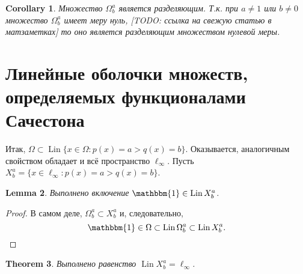 \documentclass[a4paper,14pt]{article} %
\theoremstyle{plain}
\newtheorem{theorem}{Theorem}[section]
\newtheorem{lemma}[theorem]{Lemma}
\newtheorem{corollary}[theorem]{Corollary}
\theoremstyle{definition}
\begin{document}
\begin{corollary}
	Множество $\Omega^a_b$ является разделяющим.
	Т.к. при $a\neq 1$ или $b\neq 0$ множество $\Omega^a_b$ имеет меру нуль,
	[TODO: ссылка на свежую статью в матзаметках]
	то оно является разделяющим множеством нулевой меры.
\end{corollary}

\section{Линейные оболочки множеств, определяемых функционалами Сачестона}

Итак, $\Omega \subset \operatorname{Lin}\{x\in\Omega : p(x) = a > q(x) = b\}$.
Оказывается, аналогичным свойством обладает и всё пространство $\ell_\infty$.
Пусть $X^a_b = \{x\in\ell_\infty : p(x) = a > q(x) = b\}$.

\begin{lemma}
	\label{lem:const_Lin_ell_infty}
	Выполнено включение
	$\mathbbm{1}\in \operatorname{Lin} X^a_b$.
\end{lemma}

\begin{proof}
	В самом деле,
	$\Omega^a_b \subset X^a_b$
	и, следовательно,
	\begin{equation}
		\mathbbm{1} \in \Omega \subset \operatorname{Lin} \Omega^a_b \subset \operatorname{Lin} X^a_b
		.
	\end{equation}
\end{proof}

\begin{theorem}
	\label{thm:Lin_ell_infty}
	Выполнено равенство $\operatorname{Lin} X^a_b = \ell_\infty$.
\end{theorem}
\end{document}
